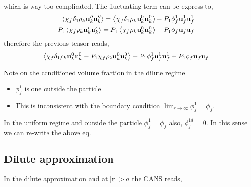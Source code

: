 which is way too complicated. 
The fluctuating term can be express to, 
\begin{align}
    \left<\chi_f \delta_1 \rho_k \textbf{u}''_k\textbf{u}''_k\right>
    = 
    \left<\chi_f \delta_1 \rho_k \textbf{u}_k^0 \textbf{u}_k^0 \right>
    - P_1 \phi_f^1 \textbf{u}_f^1\textbf{u}_f^1 \\
    P_1 \left<\chi_f \rho_k \textbf{u}_k'\textbf{u}_k'\right>
    = 
    P_1 \left<\chi_f \rho_k \textbf{u}_k^0 \textbf{u}_k^0 \right>
    - P_1 \phi_f \textbf{u}_f\textbf{u}_f 
\end{align}
therefore the previous tensor reads, 
\begin{equation}
    \left<\chi_f \delta_1 \rho_k \textbf{u}_k^0 \textbf{u}_k^0 
    - P_1 \chi_f \rho_k \textbf{u}_k^0 \textbf{u}_k^0\right>
    - P_1 \phi_f^1 \textbf{u}_f^1\textbf{u}_f^1
    + P_1 \phi_f \textbf{u}_f\textbf{u}_f 
\end{equation}

Note on the conditioned volume fraction in the dilute regime :
\begin{itemize}
    \item $\phi_f^1$ is one outside the particle 
    \item This is inconsistent with the boundary condition $\lim_{r\to\infty} \phi_f^1 = \phi_f$. 
\end{itemize}
In the uniform regime and outside the particle $\phi_f^1 = \phi_f$ also, $\phi_f^{1d} =  0$. 
In this sense we can re-write the above eq. 

\subsection{Dilute approximation}

In the dilute approximation and at $|\textbf{r}| > a$ the CANS reads,

